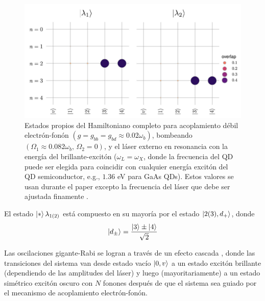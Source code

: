 \documentclass[../main.tex]{subfiles}
\begin{document}
\begin{figure}[th]
	\centering
	\includegraphics[width=0.75\linewidth]{img/EigenstatesGiant-Rabi}
	\caption{Estados propios del Hamiltoniano completo para acoplamiento débil electrón-fonón $(g= g_{bb} = g_{bd} \approx 0.02\omega_b)$, bombeando $(\Omega_1 \approx 0.082\omega_b,\, \Omega_2=0)$, y el láser externo en resonancia con la energía del brillante-excitón ($\omega_L=\omega_X$, donde la frecuencia del QD puede ser elegida para coincidir con cualquier energía excitón del QD semiconductor, e.g., $1.36$ eV para GaAs QDs). Estos valores se usan durante el paper excepto la frecuencia del láser que debe ser ajustada finamente \parencite{Vargas2022}.}
	\label{fig:eigenstatesgiant-rabi}
\end{figure}

El estado $\ket{*}\lambda_{1(2)}$ está compuesto en su mayoría por el estado $\ket{2(3),d_+}$, donde
\begin{equation}
	\ket{d_\pm} = \frac{\ket{3} \pm \ket{4}}{\sqrt{2}}
\end{equation}

Las oscilaciones gigante-Rabi se logran a través de un efecto cascada \parencite{Bin2020}, donde las transiciones del sistema van desde estado vacío $\ket{0,v}$ a un estado excitón brillante (dependiendo de las amplitudes del láser) y luego (mayoritariamente) a un estado simétrico excitón oscuro con $N$ fonones después de que el sistema sea guiado por el mecanismo de acoplamiento electrón-fonón.
\end{document}
